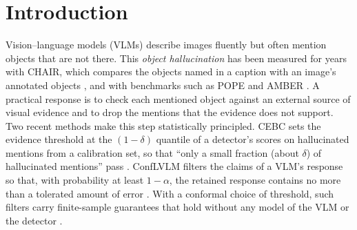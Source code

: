 \section{Introduction}\label{sec:intro}

Vision--language models (VLMs) describe images fluently but often mention objects that are not there. This \emph{object hallucination} has been measured for years with CHAIR, which compares the objects named in a caption with an image's annotated objects \citep{rohrbach2018chair}, and with benchmarks such as POPE and AMBER \citep{li2023pope,wang2023amber}. A practical response is to check each mentioned object against an external source of visual evidence and to drop the mentions that the evidence does not support. Two recent methods make this step statistically principled. CEBC sets the evidence threshold at the $(1-\delta)$ quantile of a detector's scores on hallucinated mentions from a calibration set, so that ``only a small fraction (about $\delta$) of hallucinated mentions'' pass \citep[Sec.~3.3]{cebc}. ConfLVLM filters the claims of a VLM's response so that, with probability at least $1-\alpha$, the retained response contains no more than a tolerated amount of error \citep[Eq.~1]{conflvlm}. With a conformal choice of threshold, such filters carry finite-sample guarantees that hold without any model of the VLM or the detector \citep{vovk2005algorithmic,angelopoulos2023gentle}.

